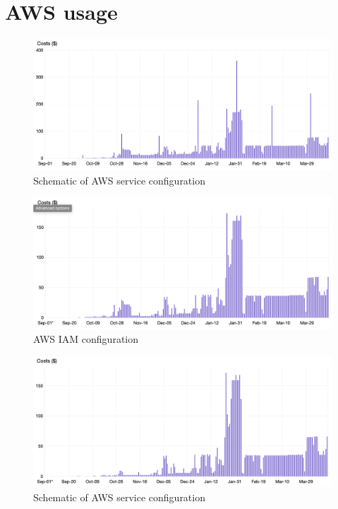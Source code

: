 \section{AWS usage}
\begin{figure}[!hbtp]
\includegraphics[width=\textwidth]{images/aws-metrics/throughmar/totalcost.png}
\caption{Schematic of AWS service  configuration\label{fg:aws}}
\end{figure}
\begin{figure}[!hbtp]
\includegraphics[width=\textwidth]{images/aws-metrics/throughmar/ec2wsage.png}
\caption{AWS IAM configuration\label{fg:iam}}
\end{figure}
\begin{figure}[!hbtp]
\includegraphics[width=\textwidth]{images/aws-metrics/throughmar/sagemaker.png}
\caption{Schematic of AWS service  configuration\label{fg:aws}}
\end{figure}
